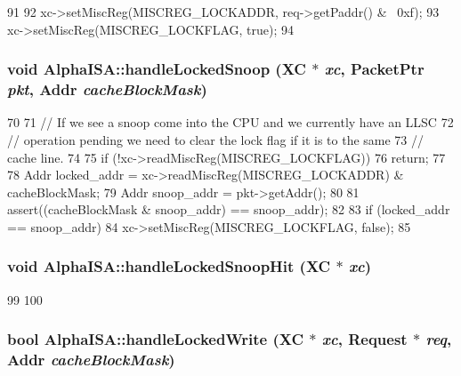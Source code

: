 \begin{DoxyCode}
91 {
92     xc->setMiscReg(MISCREG_LOCKADDR, req->getPaddr() & ~0xf);
93     xc->setMiscReg(MISCREG_LOCKFLAG, true);
94 }
\end{DoxyCode}
\hypertarget{namespaceAlphaISA_aae6ad66df5dfd5de14b36293aaf2e7f1}{
\subsubsection[{handleLockedSnoop}]{\setlength{\rightskip}{0pt plus 5cm}void AlphaISA::handleLockedSnoop (XC $\ast$ {\em xc}, \/  {\bf PacketPtr} {\em pkt}, \/  {\bf Addr} {\em cacheBlockMask})}}
\label{namespaceAlphaISA_aae6ad66df5dfd5de14b36293aaf2e7f1}



\begin{DoxyCode}
70 {
71     // If we see a snoop come into the CPU and we currently have an LLSC
72     // operation pending we need to clear the lock flag if it is to the same
73     // cache line.
74 
75     if (!xc->readMiscReg(MISCREG_LOCKFLAG))
76         return;
77 
78     Addr locked_addr = xc->readMiscReg(MISCREG_LOCKADDR) & cacheBlockMask;
79     Addr snoop_addr = pkt->getAddr();
80 
81     assert((cacheBlockMask & snoop_addr) == snoop_addr);
82 
83     if (locked_addr == snoop_addr)
84         xc->setMiscReg(MISCREG_LOCKFLAG, false);
85 }
\end{DoxyCode}
\hypertarget{namespaceAlphaISA_a300fd7902bc6b2f2407c79f776d92ee8}{
\subsubsection[{handleLockedSnoopHit}]{\setlength{\rightskip}{0pt plus 5cm}void AlphaISA::handleLockedSnoopHit (XC $\ast$ {\em xc})}}
\label{namespaceAlphaISA_a300fd7902bc6b2f2407c79f776d92ee8}



\begin{DoxyCode}
99 {
100 }
\end{DoxyCode}
\hypertarget{namespaceAlphaISA_a1087208351cf56657581daf8f2f918c8}{
\subsubsection[{handleLockedWrite}]{\setlength{\rightskip}{0pt plus 5cm}bool AlphaISA::handleLockedWrite (XC $\ast$ {\em xc}, \/  {\bf Request} $\ast$ {\em req}, \/  {\bf Addr} {\em cacheBlockMask})}}
\label{namespaceAlphaISA_a1087208351cf56657581daf8f2f918c8}



